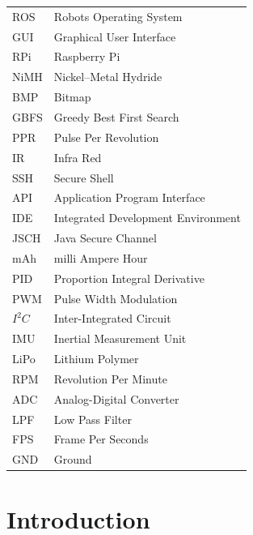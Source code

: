 \documentclass[12pt]{article}
\begin{document}
\begin{tabular}{  l    l   }
	ROS & Robots Operating System	\\
	GUI & Graphical User Interface	\\
	RPi &   Raspberry Pi	\\
	NiMH & Nickel–Metal Hydride\\
	BMP & Bitmap \\
	GBFS & Greedy Best First Search\\
	PPR & Pulse Per Revolution \\
	IR & Infra Red \\
	SSH & Secure Shell\\
	API & Application Program Interface\\
	IDE & Integrated Development Environment\\
	JSCH & Java Secure Channel\\
	mAh & milli Ampere Hour \\
	PID & Proportion Integral Derivative  \\  
	PWM &  Pulse Width Modulation  \\   
	$I^2C$  & Inter-Integrated Circuit   \\  
	IMU &  Inertial Measurement Unit \\  
	LiPo &   Lithium Polymer\\ 
	RPM   & Revolution Per Minute  \\
	ADC   & Analog-Digital Converter   \\  
	LPF & Low Pass Filter \\
	FPS & Frame Per Seconds\\
	GND & Ground
	
\end{tabular} 




\newpage

\renewcommand{\headrulewidth}{.5pt}

\listoffigures
\thispagestyle{empty}
\newpage
{}
\setcounter{page}{1}

\section{Introduction}
\end{document}
